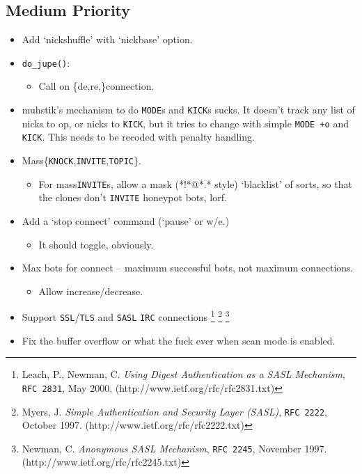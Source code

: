 \documentclass{article}
\begin{document}
\subsection{Medium Priority}\label{Medium Priority}
\begin{itemize}
\item Add `nickshuffle' with `nickbase' option.
\item {\tt do\_jupe()}:
\begin{itemize}
\item Call on \{de,re,\}connection.
\end{itemize}
\item muhstik's mechanism to do {\tt MODE}s and {\tt KICK}s sucks. It doesn't track any list of nicks to op, or nicks to {\tt KICK}, but it tries to change with simple {\tt MODE +o} and {\tt KICK}. This needs to be recoded with penalty handling.
\item Mass\{{\tt KNOCK},{\tt INVITE},{\tt TOPIC}\}.
\begin{itemize}
\item For mass{\tt INVITE}s, allow a mask (*!*@*.* style) `blacklist' of sorts, so that the clones don't {\tt INVITE} honeypot bots, lorf.
\end{itemize}
\item Add a `stop connect' command (`pause' or w/e.)
\begin{itemize}
\item It should toggle, obviously.
\end{itemize}
\item Max bots for connect -- maximum successful bots, not maximum connections.
\begin{itemize}
\item Allow increase/decrease.
\end{itemize}
\item Support {\tt SSL}/{\tt TLS} and {\tt SASL} {\tt IRC} connections%
\footnote[1]{Leach, P., Newman, C. \emph{Using Digest Authentication as a SASL Mechanism}, {\tt RFC 2831}, May 2000, (http://www.ietf.org/rfc/rfc2831.txt)}%
\footnote[2]{Myers, J. \emph{Simple Authentication and Security Layer (SASL)}, {\tt RFC 2222}, October 1997. (http://www.ietf.org/rfc/rfc2222.txt)}%
\footnote[3]{Newman, C. \emph{Anonymous SASL Mechanism}, {\tt RFC 2245}, November 1997. (http://www.ietf.org/rfc/rfc2245.txt)}
\item Fix the buffer overflow or what the fuck ever when scan mode is enabled.
\end{itemize}
\end{document}
